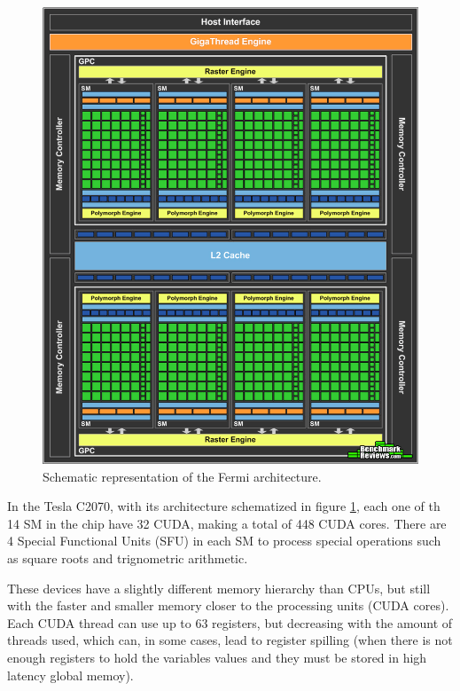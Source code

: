 \begin{figure}[!htp]
	\begin{center}
		\includegraphics[scale=0.25]{../../common/img/fermi_arch.png}
		\caption{Schematic representation of the \nvidia Fermi architecture.}
		\label{fig:FermiArchitecture}
	\end{center}
\end{figure}

In the Tesla C2070, with its architecture schematized in figure \ref{fig:FermiArchitecture}, each one of th 14 SM in the chip have 32 CUDA, making a total of 448 CUDA cores. There are 4 Special Functional Units (SFU) in each SM to process special operations such as square roots and trignometric arithmetic.

These devices have a slightly different memory hierarchy than CPUs, but still with the faster and smaller memory closer to the processing units (CUDA cores). Each CUDA thread can use up to 63 registers, but decreasing with the amount of threads used, which can, in some cases, lead to register spilling (when there is not enough registers to hold the variables values and they must be stored in high latency global memoy).

